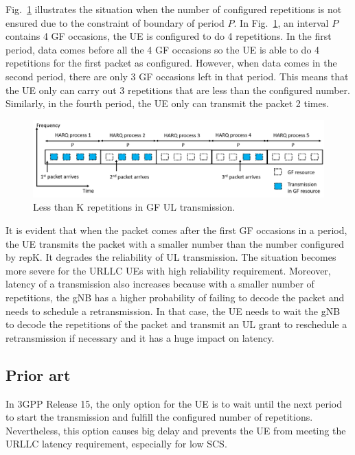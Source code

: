 \documentclass[conference]{IEEEtran}
\begin{document}
Fig.~\ref{fig1} illustrates the situation when the number of configured repetitions is not ensured due to the constraint of boundary of period $P$. In Fig.~\ref{fig1}, an interval $P$ contains 4 GF occasions, the UE is configured to do 4 repetitions. In the first period, data comes before all the 4 GF occasions so the UE is able to do 4 repetitions for the first packet as configured. However, when data comes in the second period, there are only 3 GF occasions left in that period. This means that the UE only can carry out 3 repetitions that are less than the configured number. Similarly, in the fourth period, the UE only can transmit the packet 2 times.
\begin{figure}[htbp]
\centerline{\includegraphics[scale=0.27]{fig1.png}}
\caption{Less than K repetitions in GF UL transmission.}
\label{fig1}
\vspace{-3mm}
\end{figure}

It is evident that when the packet comes after the first GF occasions in a period, the UE transmits the packet with a smaller number than the number configured by repK. It degrades the reliability of UL transmission. The situation becomes more severe for the URLLC UEs with high reliability requirement. Moreover, latency of a transmission also increases because with a smaller number of repetitions, the gNB has a higher probability of failing to decode the packet and needs to schedule a retransmission. In that case, the UE needs to wait the gNB to decode the repetitions of the packet and transmit an UL grant to reschedule a retransmission if necessary and it has a huge impact on latency.

\subsection{Prior art}\label{ICC}
In 3GPP Release 15, the only option for the UE is to wait until the next period to start the transmission and fulfill the configured number of repetitions. Nevertheless, this option causes big delay and prevents the UE from meeting the URLLC latency requirement, especially for low SCS. 
\end{document}
